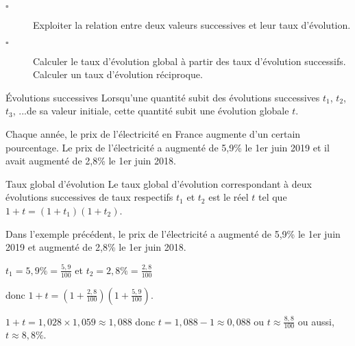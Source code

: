 \begin{titre}

\end{titre}


\begin{CpsCol}
\begin{description}
\item[$\square$] Exploiter la relation entre deux valeurs successives et leur taux d'évolution.
\item[$\square$] Calculer le taux d'évolution global à partir des taux d'évolution successifs. Calculer un taux d'évolution réciproque.
\end{description}
\end{CpsCol}

 

\begin{DefT}{Évolutions successives}
Lorsqu'une quantité subit des évolutions successives $t_1$, $t_2$, $t_3$, ...de sa valeur initiale, cette quantité subit une évolution globale $t$.
\end{DefT}

\begin{Ex}
 Chaque année, le prix de l'électricité en France augmente d'un certain pourcentage. Le prix de l'électricité a augmenté de 5,9\% le 1er juin 2019 et il avait augmenté de  2,8\% le 1er juin 2018.
\end{Ex}

\begin{ThT}{Taux global d'évolution}
Le taux global d'évolution correspondant à deux évolutions successives de taux respectifs $t_1$ et $t_2$  est le réel $t$ tel que $1+t = \left(1+t_1\right)\left(1+ t_2 \right)$.
\end{ThT}


\begin{Ex}
Dans l'exemple précédent, le prix de l'électricité a augmenté de 5,9\% le 1er juin 2019 et augmenté de  2,8\% le 1er juin 2018.

$t_1=5,9\%=\frac{5,9}{100}$ et $t_2=2,8\%=\frac{2,8}{100}$

donc $1+t = \left(1+\frac{2,8}{100}\right)\left(1+ \frac{5,9}{100} \right)$.
 
$1+t = 1,028 \times 1,059 \approx 1,088$ donc $t = 1,088 - 1 \approx 0,088$ ou $t \approx \frac{8,8}{100}$ ou aussi, $t\approx 8,8\%$.
\end{Ex}




